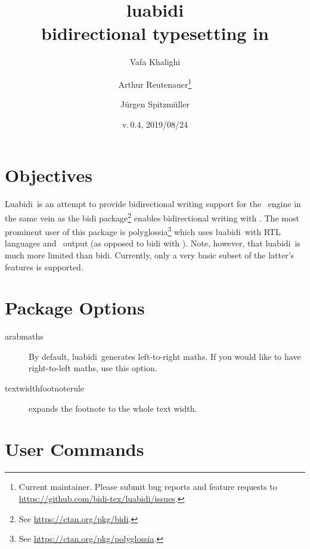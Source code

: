 \documentclass{article}
\newcommand*\lbd{\textsf{luabidi}}
\newcommand*\Lbd{\textsf{Luabidi}}
\def\fileversion{0.4}
\def\filedate{2019/08/24}
\begin{document}
	
\title{\lbd\\bidirectional typesetting in \LuaTeX}

\date{v.\,\fileversion, \filedate}

\author{Vafa Khalighi \and Arthur Reutenauer\thanks{%
		Current maintainer. Please submit bug reports and feature requests to \protect\url{https://github.com/bidi-tex/luabidi/issues}.}
	    \and Jürgen Spitzmüller}

\maketitle

\section{Objectives}
\Lbd\ is an attempt to provide bidirectional writing support for the \LuaTeX\ engine in the same vein as the \textsf{bidi} package\footnote{%
See \url{https://ctan.org/pkg/bidi}.} enables bidirectional writing with \XeTeX. The most prominent user of this package is \textsf{polyglossia}\footnote{%
See \url{https://ctan.org/pkg/polyglossia}.} which uses \lbd\ with RTL languages and \LuaTeX\ output (as opposed to \textsf{bidi} with \XeTeX). Note, however, that \lbd\ is much more limited than \textsf{bidi}. Currently, only a very basic
subset of the latter's features is supported.

\section{Package Options}

\begin{description}
	\item[arabmaths] By default, \lbd\ generates left-to-right maths. If you would like to have right-to-left
maths, use this option.
	\item[textwidthfootnoterule] expands the footnote to the whole text width.
\end{description}

\section{User Commands}
\end{document}
